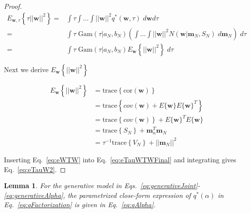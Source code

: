 \documentclass[12pt]{article}
\newtheorem{lemmaQAlpha}[lemmaQWTau]{Lemma}
\newlength\mystoreparindent
\newenvironment{myparindent}[1]{%
\setlength{\mystoreparindent}{\the\parindent}
\setlength{\parindent}{#1}
}{%
\setlength{\parindent}{\mystoreparindent}
}
\begin{document}
\begin{myparindent}{0pt}
\begin{proof}

\begin{align}
E_{\mathbf{w},\tau}\left\{\tau||\mathbf{w}||^2\right\}=&\int\tau\int\ldots\int||\mathbf{w}||^2q^*(\mathbf{w},\tau)\;d\mathbf{w}d\tau\nonumber\\
=&\int\tau\;\text{Gam}(\tau|a_N,b_N)\left(\int\ldots\int||\mathbf{w}||^2N(\mathbf{w}|\mathbf{m}_N,S_N)\;d\mathbf{m}_N\right)\;d\tau\nonumber\\
=&\int\tau\;\text{Gam}(\tau|a_N,b_N)E_\mathbf{w}\left\{||\mathbf{w}||^2\right\}\;d\tau\label{eq:eTauWTWFinal}
\end{align}

Next we derive $E_\mathbf{w}\left\{||\mathbf{w}||^2\right\}$

\begin{align}
E_\mathbf{w}\left\{||\mathbf{w}||^2\right\}&=\text{trace}\left\{\text{cor}(\mathbf{w})\right\}\nonumber\\
&=\text{trace}\left\{cov(\mathbf{w})+E\{\mathbf{w}\}E\{\mathbf{w}\}^T\right\}\nonumber\\
&=\text{trace}\left\{cov(\mathbf{w})\right\}+E\{\mathbf{w}\}^TE\{\mathbf{w}\}\nonumber\\
&=\text{trace}\left\{S_N\right\}+\mathbf{m}_n^T\mathbf{m}_N\nonumber\\
&=\tau^{-1}\text{trace}\left\{V_N\right\}+||\mathbf{m}_N||^2\label{eq:eWTW}
\end{align}

Inserting Eq.~\ref{eq:eWTW} into Eq.~\ref{eq:eTauWTWFinal} and integrating
gives Eq.~\ref{eq:eTauW2}.
\end{proof}
\end{myparindent}

\begin{lemmaQAlpha}
\label{lemma:qAlpha}
For the generative model in Eqs.~\ref{eq:generativeJoint}-\ref{eq:generativeAlpha}, the parametrized close-form
expression of $q^*(\alpha)$ in Eq.~\ref{eq:qFactorization} is given in
Eq.~\ref{eq:qAlpha}.
\end{lemmaQAlpha}
\end{document}
